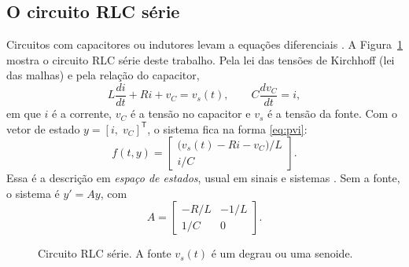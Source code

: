 \subsection{O circuito RLC série}
\label{sec:modelo}

Circuitos com capacitores ou indutores levam a equações diferenciais \cite[seção~10.8]{aquino2020}. A Figura~\ref{fig:circuito} mostra o circuito RLC série deste trabalho. Pela lei das tensões de Kirchhoff (lei das malhas) e pela relação do capacitor,
\begin{equation}
L\frac{di}{dt}+Ri+v_C = v_s(t), \qquad C\frac{dv_C}{dt}=i,
\label{eq:kvl}
\end{equation}
em que \(i\) é a corrente, \(v_C\) é a tensão no capacitor e \(v_s\) é a tensão da fonte. Com o vetor de estado \(y=[i,\;v_C]^{\mathsf T}\), o sistema fica na forma \eqref{eq:pvi}:
\begin{equation}
f(t,y)=
\begin{bmatrix}
\bigl(v_s(t)-Ri-v_C\bigr)/L \\
i/C
\end{bmatrix}.
\label{eq:sistema}
\end{equation}
Essa é a descrição em \emph{espaço de estados}, usual em sinais e sistemas \cite{lathi2007}. Sem a fonte, o sistema é \(y'=Ay\), com
\begin{equation}
A=
\begin{bmatrix}
-R/L & -1/L \\
1/C & 0
\end{bmatrix}.
\label{eq:matriz}
\end{equation}

\begin{figure}[htbp]
\centering
\caption{Circuito RLC série. A fonte \(v_s(t)\) é um degrau ou uma senoide.}
\label{fig:circuito}
\end{figure}

